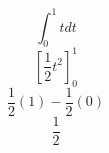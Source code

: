 \documentclass{article}
\begin{document}
\section{}
$$\int_{0}^{1} t d t
$$$$[ \frac{1}{2} t^{2} ]_{0}^{1}
$$$$\frac{1}{2} ( 1 ) - \frac{1}{2} ( 0 )
$$$$\frac{1}{2}
$$
\end{document}
